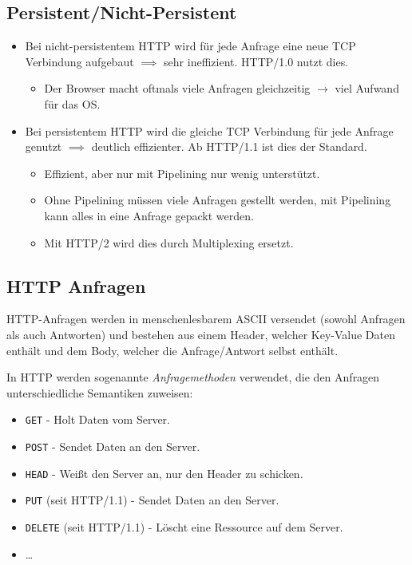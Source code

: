 \documentclass[a4paper, 11pt, accentcolor = tud3b]{tudreport}
\begin{document}
            \subsection{Persistent/Nicht-Persistent} %
	            \begin{itemize}
	            	\item Bei nicht-persistentem HTTP wird für jede Anfrage eine neue TCP Verbindung aufgebaut \(\implies\) sehr ineffizient. HTTP/1.0 nutzt dies.
		            	\begin{itemize}
		            		\item Der Browser macht oftmals viele Anfragen gleichzeitig \(\rightarrow\) viel Aufwand für das OS.
		            	\end{itemize}
	            	\item Bei persistentem HTTP wird die gleiche TCP Verbindung für jede Anfrage genutzt \(\implies\) deutlich effizienter. Ab HTTP/1.1 ist dies der Standard.
		            	\begin{itemize}
		            		\item Effizient, aber nur mit Pipelining nur wenig unterstützt.
		            		\item Ohne Pipelining müssen viele Anfragen gestellt werden, mit Pipelining kann alles in eine Anfrage gepackt werden.
		            		\item Mit HTTP/2 wird dies durch Multiplexing ersetzt.
		            	\end{itemize}
	            \end{itemize}

            \subsection{HTTP Anfragen}
                HTTP-Anfragen werden in menschenlesbarem ASCII versendet (sowohl Anfragen als auch Antworten) und bestehen aus einem Header, welcher Key-Value Daten enthält und dem Body, welcher die Anfrage/Antwort selbst enthält.
                
                In HTTP werden sogenannte \textit{Anfragemethoden} verwendet, die den Anfragen unterschiedliche Semantiken zuweisen:
                \begin{itemize}
                	\item \texttt{GET} - Holt Daten vom Server.
                	\item \texttt{POST} - Sendet Daten an den Server.
                	\item \texttt{HEAD} - Weißt den Server an, nur den Header zu schicken.
                	\item \texttt{PUT} (seit HTTP/1.1) - Sendet Daten an den Server.
                	\item \texttt{DELETE} (seit HTTP/1.1) - Löscht eine Ressource auf dem Server.
                	\item \dots
                \end{itemize}
                
\end{document}

